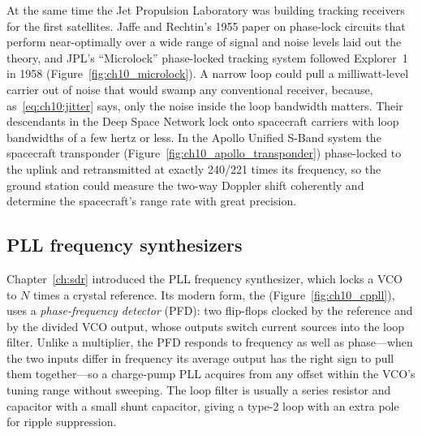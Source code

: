 
\begin{history}
At the same time the Jet Propulsion Laboratory was building tracking receivers for the first
satellites. Jaffe and Rechtin's 1955 paper on phase-lock circuits that perform near-optimally over a
wide range of signal and noise levels laid out the theory, and JPL's ``Microlock'' phase-locked
tracking system followed Explorer~1 in 1958 (Figure~\ref{fig:ch10_microlock}). A narrow loop could
pull a milliwatt-level carrier out of noise that would swamp any conventional receiver, because,
as~\eqref{eq:ch10:jitter} says, only the noise inside the loop bandwidth matters. Their descendants
in the Deep Space Network lock onto spacecraft carriers with loop bandwidths of a few hertz or less.
In the Apollo Unified S-Band system the spacecraft transponder (Figure~\ref{fig:ch10_apollo_transponder})
phase-locked to the uplink and retransmitted at exactly 240/221 times its frequency, so the ground
station could measure the two-way Doppler shift coherently and determine the spacecraft's range rate
with great precision.
\end{history}



\subsection{PLL frequency synthesizers}

Chapter~\ref{ch:sdr} introduced the PLL frequency synthesizer, which locks a VCO to $N$ times a
crystal reference. Its modern form, the  (Figure~\ref{fig:ch10_cppll}), uses
a \emph{phase-frequency detector} (PFD): two flip-flops clocked by the reference and by the divided
VCO output, whose outputs switch current sources into the loop filter. Unlike a multiplier, the PFD
responds to frequency as well as phase---when the two inputs differ in frequency its average output
has the right sign to pull them together---so a charge-pump PLL acquires from any offset within the
VCO's tuning range without sweeping. The loop filter is usually a series resistor and capacitor
with a small shunt capacitor, giving a type-2 loop with an extra pole for ripple suppression.

